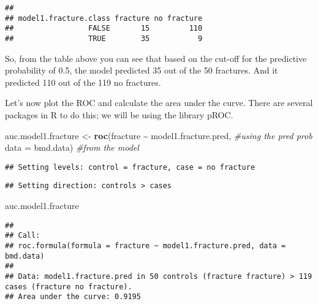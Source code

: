 \documentclass[
]{book}
\newenvironment{Shaded}{\begin{snugshade}}{\end{snugshade}}
\newcommand{\AttributeTok}[1]{\textcolor[rgb]{0.13,0.29,0.53}{#1}}
\newcommand{\CommentTok}[1]{\textcolor[rgb]{0.56,0.35,0.01}{\textit{#1}}}
\newcommand{\DecValTok}[1]{\textcolor[rgb]{0.00,0.00,0.81}{#1}}
\newcommand{\FloatTok}[1]{\textcolor[rgb]{0.00,0.00,0.81}{#1}}
\newcommand{\FunctionTok}[1]{\textcolor[rgb]{0.13,0.29,0.53}{\textbf{#1}}}
\newcommand{\NormalTok}[1]{#1}
\newcommand{\OtherTok}[1]{\textcolor[rgb]{0.56,0.35,0.01}{#1}}
\newcommand{\SpecialCharTok}[1]{\textcolor[rgb]{0.81,0.36,0.00}{\textbf{#1}}}
\newcommand{\StringTok}[1]{\textcolor[rgb]{0.31,0.60,0.02}{#1}}
\begin{document}
\begin{verbatim}
##                      
## model1.fracture.class fracture no fracture
##                 FALSE       15         110
##                 TRUE        35           9
\end{verbatim}

So, from the table above you can see that based on the cut-off for
the predictive probability of 0.5, the model predicted 35 out of
the 50 fractures. And it predicted 110 out of the 119 no fractures.

Let's now plot the ROC and calculate the area under the curve. There are
several packages in R to do this; we will be using the library pROC.

\begin{Shaded}
\begin{Highlighting}[]
\NormalTok{  auc.model1.fracture }\OtherTok{\textless{}{-}} \FunctionTok{roc}\NormalTok{(fracture }\SpecialCharTok{\textasciitilde{}}\NormalTok{ model1.fracture.pred, }\CommentTok{\#using the pred prob}
                             \AttributeTok{data =}\NormalTok{ bmd.data)                 }\CommentTok{\#from the model}
\end{Highlighting}
\end{Shaded}

\begin{verbatim}
## Setting levels: control = fracture, case = no fracture
\end{verbatim}

\begin{verbatim}
## Setting direction: controls > cases
\end{verbatim}

\begin{Shaded}
\begin{Highlighting}[]
\NormalTok{  auc.model1.fracture}
\end{Highlighting}
\end{Shaded}

\begin{verbatim}
## 
## Call:
## roc.formula(formula = fracture ~ model1.fracture.pred, data = bmd.data)
## 
## Data: model1.fracture.pred in 50 controls (fracture fracture) > 119 cases (fracture no fracture).
## Area under the curve: 0.9195
\end{verbatim}

\begin{Shaded}
\end{Shaded}
\end{document}
